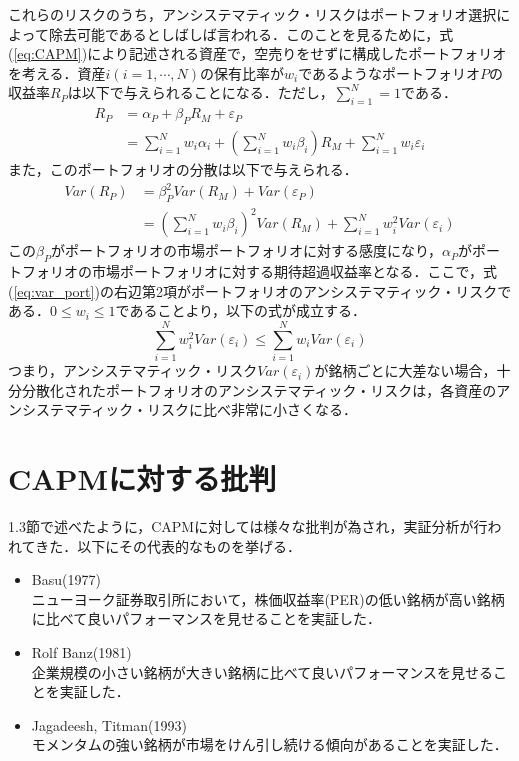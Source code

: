 \documentclass[11pt]{jreport}
\begin{document}
これらのリスクのうち，アンシステマティック・リスクはポートフォリオ選択によって除去可能であるとしばしば言われる．このことを見るために，式(\ref{eq:CAPM})により記述される資産で，空売りをせずに構成したポートフォリオを考える．資産$i(i=1,\cdots,N)$の保有比率が$w_i$であるようなポートフォリオ$P$の収益率$R_P$は以下で与えられることになる．ただし，$\sum_{i=1}^N = 1$である．
\begin{equation}
\begin{split}
R_P &= \alpha_P + \beta_PR_M + \varepsilon_P\\
&= \sum_{i=1}^N w_i\alpha_i
+\left(\sum_{i=1}^N w_i\beta_i\right)R_M
+\sum_{i=1}^N w_i\varepsilon_i
\end{split}
\end{equation}
また，このポートフォリオの分散は以下で与えられる．
\begin{equation}
\begin{split}
Var(R_P) &= \beta_P^2 Var(R_M) + Var(\varepsilon_P)\\
& = \left(\sum_{i=1}^N w_i\beta_i\right)^2Var(R_M) + \sum_{i=1}^N w_i^2 Var(\varepsilon_i)
\label{eq:var_port}
\end{split}
\end{equation}
この$\beta_P$がポートフォリオの市場ポートフォリオに対する感度になり，$\alpha_P$がポートフォリオの市場ポートフォリオに対する期待超過収益率となる．ここで，式(\ref{eq:var_port})の右辺第2項がポートフォリオのアンシステマティック・リスクである．$0\leq w_i \leq 1$であることより，以下の式が成立する．
\begin{equation}
\sum_{i=1}^N w_i^2Var(\varepsilon_i) \leq \sum_{i=1}^N w_iVar(\varepsilon_i)
\end{equation}
つまり，アンシステマティック・リスク$Var(\varepsilon_i)$が銘柄ごとに大差ない場合，十分分散化されたポートフォリオのアンシステマティック・リスクは，各資産のアンシステマティック・リスクに比べ非常に小さくなる．



\section{CAPMに対する批判}
1.3節で述べたように，CAPMに対しては様々な批判が為され，実証分析が行われてきた．以下にその代表的なものを挙げる．
\begin{itemize}
\item Basu(1977)\cite{Basu}\\
ニューヨーク証券取引所において，株価収益率(PER)の低い銘柄が高い銘柄に比べて良いパフォーマンスを見せることを実証した．
\item Rolf Banz(1981)\cite{Banz}\\
企業規模の小さい銘柄が大きい銘柄に比べて良いパフォーマンスを見せることを実証した．
\item Jagadeesh, Titman(1993)\cite{Jagadeesh}\\
モメンタムの強い銘柄が市場をけん引し続ける傾向があることを実証した．
\end{itemize}
\end{document}
